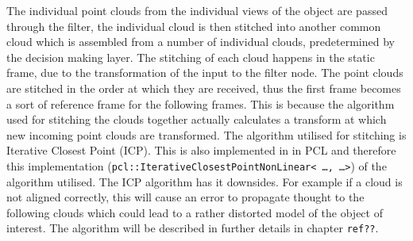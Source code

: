 The individual point clouds from the individual views of the object are passed through the filter, the individual cloud is then stitched into another common cloud which is assembled from a number of individual clouds, predetermined by the decision making layer. The stitching of each cloud happens in the static frame, due to the transformation of the input to the filter node. The point clouds are stitched in the order at which they are received, thus the first frame becomes a sort of reference frame for the following frames. This is because the algorithm used for stitching the clouds together actually calculates a transform at which new incoming point clouds are transformed. The algorithm utilised for stitching is Iterative Closest Point (ICP). This is also implemented in in PCL and therefore this implementation (\texttt{pcl::IterativeClosestPointNonLinear< \ldots , \ldots >}) of the algorithm utilised. The ICP algorithm has it downsides. For example if a cloud is not aligned correctly, this will cause an error to propagate thought to the following clouds which could lead to a rather distorted model of the object of interest\cite{choe2007registration}. The algorithm will be described in further details in chapter \texttt{ref??}.